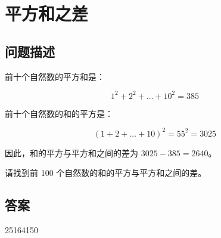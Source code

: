 \section{平方和之差}\label{sec:problem06}
\subsection{问题描述}
\begin{tcolorbox}
	前十个自然数的平方和是：

	\[
		1^2 + 2^2 + \dots + 10^2 = 385
	\]

	前十个自然数的和的平方是：

	\[
		(1 + 2 + \dots + 10)^2 = 55^2 = 3025
	\]

	因此，和的平方与平方和之间的差为 \( 3025 - 385 = 2640 \)。

	请找到前 100 个自然数的和的平方与平方和之间的差。
\end{tcolorbox}

\subsection{答案}
 25164150
